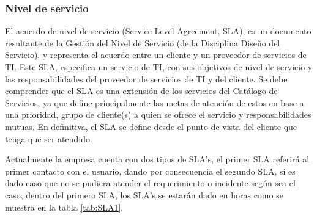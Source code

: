 \subsubsection{Nivel de servicio}
El acuerdo de nivel de servicio (Service Level Agreement, SLA), es un documento resultante de la Gestión del Nivel de Servicio (de la Disciplina Diseño del Servicio), y representa el acuerdo entre un cliente y un proveedor de servicios de TI. Este SLA, especifica un servicio de TI, con sus objetivos de nivel de servicio y las responsabilidades del proveedor de servicios de TI y del cliente. Se debe comprender que el SLA es una extensión de los servicios del Catálogo de Servicios, ya que define principalmente las metas de atención de estos en base a una prioridad, grupo de cliente(s) a quien se ofrece el servicio y responsabilidades mutuas. En definitiva, el SLA se define desde el punto de vista del cliente que tenga que ser atendido.

Actualmente la empresa cuenta con dos tipos de SLA’s, el primer SLA referirá al primer contacto con el usuario, dando por consecuencia el segundo SLA, si es dado caso que no se pudiera atender el requerimiento o incidente según sea el caso, dentro del primero SLA, los SLA’s se estarán dado en horas como se muestra en la tabla \ref{tab:SLA1}.


